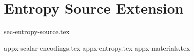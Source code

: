\documentclass[11pt]{article}
\begin{document}
\newpage
\section{Entropy Source Extension}
\label{sec:randombit}
{sec-entropy-source.tex}


\newpage
\printbibliography


%
%

\newpage
\begin{appendices}
\label{sec:appendix}
{appx-scalar-encodings.tex}
{appx-entropy.tex}
{appx-materials.tex}
\end{appendices}

\end{document}
